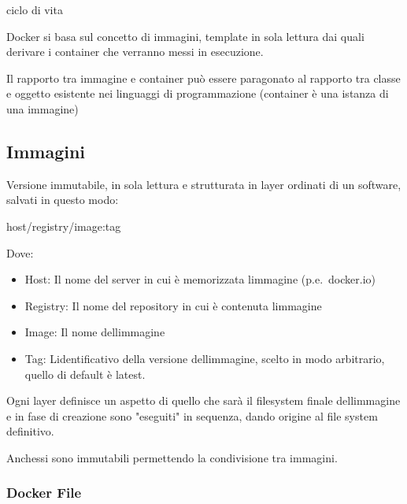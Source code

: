 \documentclass[
]{article}
\providecommand{\tightlist}{%
  \setlength{\itemsep}{0pt}\setlength{\parskip}{0pt}}
\begin{document}
{ciclo di vita}

{}

{Docker si basa sul concetto di immagini, template in sola lettura dai
quali derivare i container che verranno messi in esecuzione.}

{Il rapporto tra immagine e container può essere paragonato al rapporto
tra classe e oggetto esistente nei linguaggi di programmazione
(}{container è una istanza di una immagine}{)}

{}

\subsection{\texorpdfstring{{Immagini}}{Immagini}}\label{h.66142ewwvybi}

{Versione immutabile, in sola lettura e strutturata in layer ordinati di
un software, salvati in questo modo:}

{}

{host/registry/image:tag}

{}

{Dove:}

\begin{itemize}
\tightlist
\item
  {Host}{: Il nome del server in cui è memorizzata
  l\textquotesingle immagine }{(p.e.}{~docker.io) }
\item
  {Registry}{: Il nome del repository in cui è contenuta
  l\textquotesingle immagine }
\item
  {Image}{: Il nome dell\textquotesingle immagine }
\item
  {Tag}{: L\textquotesingle identificativo della versione
  dell\textquotesingle immagine, scelto in modo arbitrario, quello di
  default è }{latest}{.}
\end{itemize}

{}

{Ogni layer definisce un aspetto di quello che sarà il filesystem finale
dell\textquotesingle immagine e in fase di creazione sono "eseguiti" in
sequenza, dando origine al file system definitivo.}

{Anch\textquotesingle essi sono immutabili permettendo la condivisione
tra immagini.}

\subsubsection{\texorpdfstring{{Docker
File}}{Docker File}}\label{h.s0tfc13b76ng}
\end{document}
